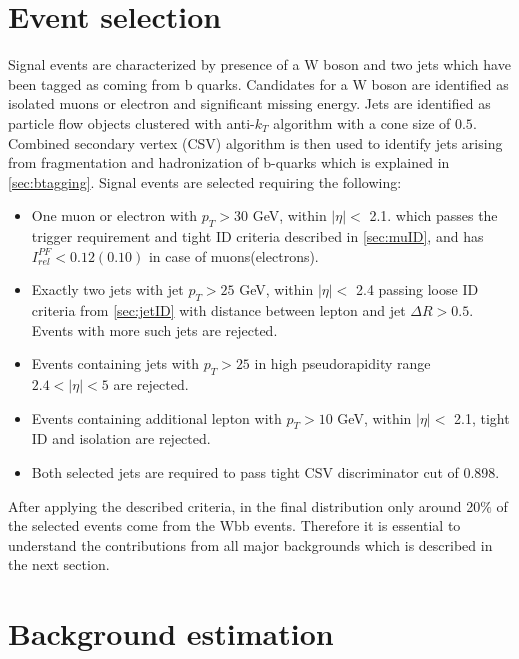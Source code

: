 
\section{Event selection}
\label{sec:selection}
Signal events are characterized by presence of a W boson and two jets which have been tagged as coming from b quarks. 
Candidates for a W boson are identified as isolated muons or electron and significant missing energy. 
Jets are identified as particle flow objects clustered with anti-$k_T$ algorithm with a cone size of $0.5$.
Combined secondary vertex (CSV) algorithm is then used to identify jets arising from fragmentation and hadronization of b-quarks which is explained in \ref{sec:btagging}. Signal events are selected requiring the following:
\begin{itemize}
\item One muon or electron with $p_T>30$ GeV, within $|\eta|<$ 2.1. which passes the trigger requirement and tight ID criteria described in \ref{sec:muID}, and has $I_{rel}^{PF}<0.12(0.10)$ in case of muons(electrons).
\item Exactly two jets with jet $p_T>25$ GeV, within $|\eta|<$ 2.4 passing loose ID criteria from \ref{sec:jetID} with distance between lepton and jet $\Delta R>0.5$. Events with more such jets are rejected.
\item Events containing jets with $p_T>25$ in high pseudorapidity range $2.4<|\eta|<5$ are rejected.
\item Events containing additional lepton with $p_T>10$ GeV, within $|\eta|<$ 2.1, tight ID and isolation are rejected.
\item Both selected jets are required to pass tight CSV discriminator cut of 0.898.
\end{itemize} 

After applying the described criteria, in the final distribution only around 20$\%$ of the selected events come from the Wbb events. Therefore it is essential to understand the contributions from all major backgrounds which is described in the next section. 

\section{Background estimation}

